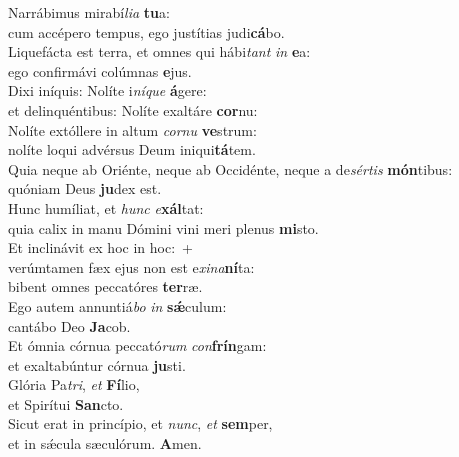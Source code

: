\evenverse Narrábimus mirabí\textit{li}\textit{a} \textbf{tu}a:~\*\\
\evenverse cum accépero tempus, ego justítias judi\textbf{cá}bo.\\
\oddverse Liquefácta est terra, et omnes qui hábi\textit{tant} \textit{in} \textbf{e}a:~\*\\
\oddverse ego confirmávi colúmnas \textbf{e}jus.\\
\evenverse Dixi iníquis: Nolíte i\textit{ní}\textit{que} \textbf{á}gere:~\*\\
\evenverse et delinquéntibus: Nolíte exaltáre \textbf{cor}nu:\\
\oddverse Nolíte extóllere in altum \textit{cor}\textit{nu} \textbf{ve}strum:~\*\\
\oddverse nolíte loqui advérsus Deum iniqui\textbf{tá}tem.\\
\evenverse Quia neque ab Oriénte, neque ab Occidénte, neque a de\textit{sér}\textit{tis} \textbf{món}tibus:~\*\\
\evenverse quóniam Deus \textbf{ju}dex est.\\
\oddverse Hunc humíliat, et \textit{hunc} \textit{e}\textbf{xál}tat:~\*\\
\oddverse quia calix in manu Dómini vini meri plenus \textbf{mi}sto.\\
\evenverse Et inclinávit ex hoc in hoc:~+\\
\evenverse  verúmtamen fæx ejus non est e\textit{xi}\textit{na}\textbf{ní}ta:~\*\\
\evenverse bibent omnes peccatóres \textbf{ter}ræ.\\
\oddverse Ego autem annuntiá\textit{bo} \textit{in} \textbf{sǽ}culum:~\*\\
\oddverse cantábo Deo \textbf{Ja}cob.\\
\evenverse Et ómnia córnua peccató\textit{rum} \textit{con}\textbf{frín}gam:~\*\\
\evenverse et exaltabúntur córnua \textbf{ju}sti.\\
\oddverse Glória Pa\textit{tri}, \textit{et} \textbf{Fí}lio,~\*\\
\oddverse et Spirítui \textbf{San}cto.\\
\evenverse Sicut erat in princípio, et \textit{nunc}, \textit{et} \textbf{sem}per,~\*\\
\evenverse et in sǽcula sæculórum. \textbf{A}men.\\
